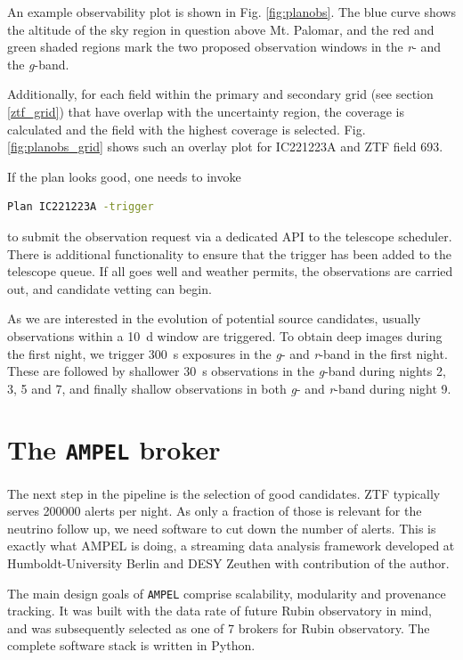 \documentclass[
    a4paper, %
    fontsize=10pt, %
    twoside=true, %
    numbers=noenddot, %
    fontmethod=tex,
]{kaobook}
\begin{document}
An example observability plot is shown in Fig. \ref{fig:planobs}. The blue curve shows the altitude of the sky region in question above Mt. Palomar, and the red and green shaded regions mark the two proposed observation windows in the \textit{r}- and the \textit{g}-band.

Additionally, for each field within the primary and secondary grid (see section \ref{ztf_grid}) that have overlap with the uncertainty region, the coverage is calculated and the field with the highest coverage is selected. Fig. \ref{fig:planobs_grid} shows such an overlay plot for IC221223A and ZTF field 693.

If the plan looks good, one needs to invoke
\begin{lstlisting}[language=bash,style=kaolstplain]
Plan IC221223A -trigger
\end{lstlisting} 
to submit the observation request via a dedicated API to the telescope scheduler. There is additional functionality to ensure that the trigger has been added to the telescope queue. If all goes well and weather permits, the observations are carried out, and candidate vetting can begin.

As we are interested in the evolution of potential source candidates, usually observations within a \SI{10}{\day} window are triggered. To obtain deep images during the first night, we trigger \SI{300}{\second} exposures in the \textit{g}- and \textit{r}-band in the first night. These are followed by shallower \SI{30}{\second} observations in the \textit{g}-band during nights 2, 3, 5 and 7, and finally shallow observations in both \textit{g}- and \textit{r}-band during night 9.

\section{The \texttt{AMPEL} broker} \label{ampel}
The next step in the pipeline is the selection of good candidates. ZTF typically serves 200000 alerts per night. As only a fraction of those is relevant for the neutrino follow up, we need software to cut down the number of alerts. This is exactly what AMPEL is doing, a streaming data analysis framework developed at Humboldt-University Berlin and DESY Zeuthen with contribution of the author.

The main design goals of \texttt{AMPEL} comprise scalability, modularity and provenance tracking. It was built with the data rate of future Rubin observatory  in mind, and was subsequently selected as one of 7 brokers for Rubin observatory. The complete software stack is written in Python.
\end{document}
